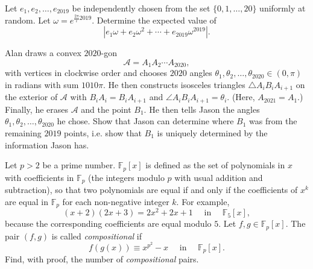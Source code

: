 \begin{question}[name={2019 PUMaC, Team Round, \href{https://artofproblemsolving.com/community/c4p23950940}{Problem 13}}]
	Let $e_1, e_2, \dots, e_{2019}$ be independently chosen from the set $\{0, 1, \dots , 20\}$ uniformly at random.
	Let $\omega = e^{\frac{2\pi}{i} 2019}$. Determine the expected value of $$|e_1\omega + e_2\omega^2 + \cdots + e_{2019}\omega^{2019}|.$$
\end{question}










\begin{question}[name={2019 HMMT, Team, \href{https://artofproblemsolving.com/community/c129h1786129p11794991}{Problem 3}}]
	Alan draws a convex $2020$-gon $$\mathcal{A}=A_1A_2\dotsm A_{2020},$$ with vertices in clockwise order and chooses $2020$ angles $\theta_1, \theta_2, \dotsc, \theta_{2020}\in (0, \pi)$ in radians with sum $1010\pi$. He then constructs isosceles triangles $\triangle A_iB_iA_{i+1}$ on the exterior of $\mathcal{A}$ with $B_iA_i=B_iA_{i+1}$ and $\angle A_iB_iA_{i+1}=\theta_i$. (Here, $A_{2021}=A_1$.) Finally, he erases $\mathcal{A}$ and the point $B_1$. He then tells Jason the angles $\theta_1, \theta_2, \dotsc, \theta_{2020}$ he chose. Show that Jason can determine where $B_1$ was from the remaining $2019$ points, i.e. show that $B_1$ is uniquely determined by the information Jason has.
\end{question}





\begin{question}[name={2019 HMMT, Team, \href{https://artofproblemsolving.com/community/c129h1786136p11795007}{Problem 9}}]
	Let $p > 2$ be a prime number. $\mathbb{F}_p[x]$ is defined as the set of polynomials in $x$ with coefficients in $\mathbb{F}_p$ (the integers modulo $p$ with usual addition and subtraction), so that two polynomials are equal if and only if the coefficients of $x^k$ are equal in $\mathbb{F}_p$ for each non-negative integer $k$. For example, $$(x+2)(2x+3) = 2x^2 + 2x + 1 \quad \text{  in } \quad \mathbb{F}_5[x],$$ because the corresponding coefficients are equal modulo $5$. Let $f, g \in \mathbb{F}_p[x]$. The pair $(f, g)$ is called \textit{compositional} if
	\[f(g(x)) \equiv x^{p^2} - x \quad \text{ in } \quad \mathbb{F}_p[x].\] Find, with proof, the number of \textit{compositional} pairs.
\end{question}





